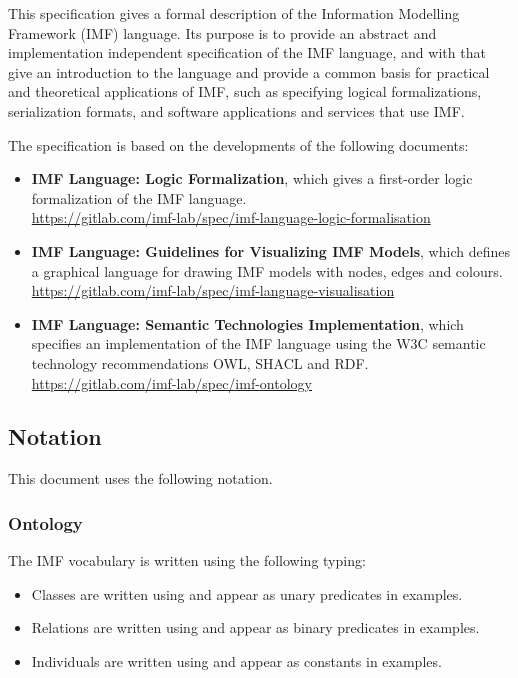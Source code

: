

This specification gives a formal description of the Information
Modelling Framework (IMF) language.
%
Its purpose is to provide an abstract and implementation independent
specification of the IMF language, and with that give an introduction
to the language and provide a common basis for practical and
theoretical applications of IMF, such as specifying logical
formalizations, serialization formats, and software applications and
services that use IMF.

The specification is based on the developments of the following documents:
\begin{itemize}
\item \textbf{IMF Language: Logic Formalization}, which gives a
  first-order logic formalization of the IMF language.\\
  \url{https://gitlab.com/imf-lab/spec/imf-language-logic-formalisation}
\item \textbf{IMF Language: Guidelines for Visualizing IMF Models},
  which defines a graphical language for drawing IMF models with
  nodes, edges and colours.\\
  \url{https://gitlab.com/imf-lab/spec/imf-language-visualisation}
\item \textbf{IMF Language: Semantic Technologies Implementation},
  which specifies an implementation of the IMF language using the W3C
  semantic technology recommendations OWL, SHACL and RDF.\\
  \url{https://gitlab.com/imf-lab/spec/imf-ontology}
\end{itemize}



\subsection*{Notation}

This document uses the following notation.

\subsubsection*{Ontology}

The IMF vocabulary is written using the following typing:
\begin{itemize}
\item Classes are written using  and appear as
  unary predicates in examples.
\item Relations are written using  and appear as
  binary predicates in examples.
\item Individuals are written using  and appear as
  constants in examples.
\end{itemize}


